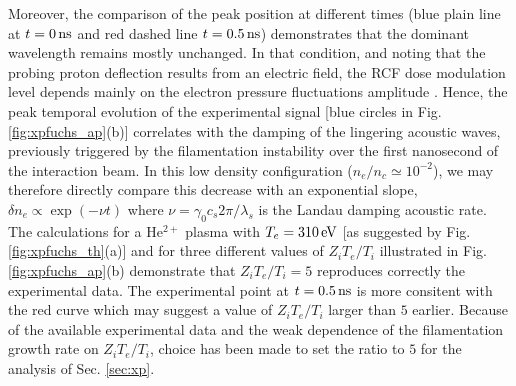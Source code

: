 \documentclass[
 reprint,
 superscriptaddress,
 amsmath,amssymb,
 aps,
]{revtex4-1}
\def\tc{\textcolor{red}}
\begin{document}
Moreover, the comparison of the peak position at different times (blue plain line at $t=0\,\rm ns$ and red dashed line $t=0.5\,\rm ns$) demonstrates that the dominant wavelength remains mostly unchanged.  In that condition, and noting that the probing proton deflection results from an electric field, the RCF dose modulation level depends mainly on the electron pressure fluctuations amplitude \cite[]{RSI_protograhyb}.
Hence, the peak temporal evolution of the experimental signal [blue circles in Fig. \ref{fig:xpfuchs_ap}(b)] correlates with the damping of the lingering acoustic waves, previously triggered by the filamentation instability over the first nanosecond of  the interaction beam.
In this low density configuration ($n_e/n_c\simeq10^{-2}$), 
we may therefore directly compare this decrease with an exponential slope, $\delta n_e \propto \exp(-\nu t)$ where $\nu = \gamma_0 c_s 2\pi/\lambda_s$ is the Landau damping acoustic rate. The calculations for a He$^{2+}$ plasma with \tc{$T_e=310\, \rm eV$} [as suggested by  Fig. \ref{fig:xpfuchs_th}(a)] and  for three different values of $Z_iT_e/T_i$ illustrated in  Fig. \ref{fig:xpfuchs_ap}(b) demonstrate that $Z_iT_e/T_i=5$ reproduces correctly the experimental data. The experimental point at $t=0.5\,\rm ns$ is more consitent with the red curve which may suggest a value of  $Z_iT_e/T_i $ larger than $5$ earlier. Because of the available experimental data and the weak dependence of the filamentation growth rate on $Z_iT_e/T_i$, choice has been made to set the ratio to  $5$ for the analysis of Sec. \ref{sec:xp}.


\end{document}
